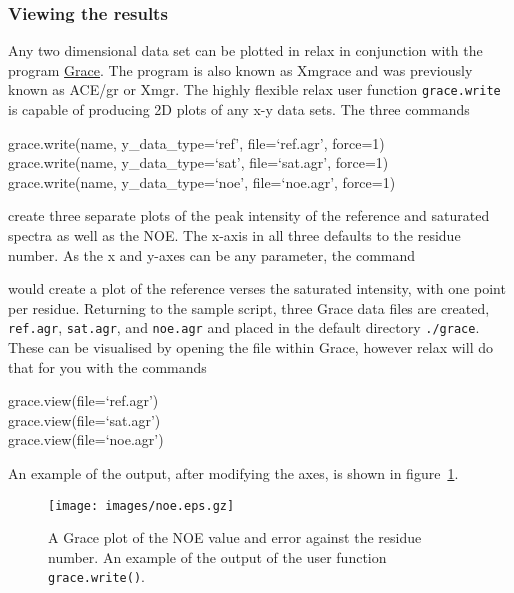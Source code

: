 \subsubsection{Viewing the results}

Any two dimensional data set can be plotted in relax in conjunction with the program \href{http://plasma-gate.weizmann.ac.il/Grace/}{Grace}.  The program is also known as Xmgrace and was previously known as ACE/gr or Xmgr.  The highly flexible relax user function \texttt{grace.write} is capable of producing 2D plots of any x-y data sets.  The three commands

\begin{exampleenv}
grace.write(name, y\_data\_type=`ref', file=`ref.agr', force=1) \\
grace.write(name, y\_data\_type=`sat', file=`sat.agr', force=1) \\
grace.write(name, y\_data\_type=`noe', file=`noe.agr', force=1)
\end{exampleenv}

create three separate plots of the peak intensity of the reference and saturated spectra as well as the NOE.  The x-axis in all three defaults to the residue number.  As the x and y-axes can be any parameter, the command


would create a plot of the reference verses the saturated intensity, with one point per residue.  Returning to the sample script, three Grace data files are created, \texttt{ref.agr}, \texttt{sat.agr}, and \texttt{noe.agr} and placed in the default directory \texttt{./grace}.  These can be visualised by opening the file within Grace, however relax will do that for you with the commands

\begin{exampleenv}
grace.view(file=`ref.agr') \\
grace.view(file=`sat.agr') \\
grace.view(file=`noe.agr')
\end{exampleenv}

An example of the output, after modifying the axes, is shown in figure~\ref{fig: NOE plot}.

\begin{figure}
\centerline{\texttt{[image: images/noe.eps.gz]}}
\caption[NOE plot]{A Grace plot of the NOE value and error against the residue number.  An example of the output of the user function \texttt{grace.write()}.}\label{fig: NOE plot}
\end{figure}



